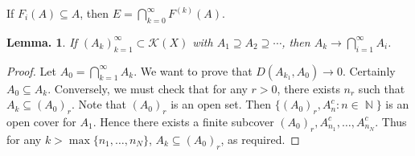 \documentclass[11pt, a4paper]{memoir}
\DeclareMathOperator{\N}{{\mathbb{N}}}
\theoremstyle{change}
\newtheorem{lemma}[theorem]{Lemma.}
\theoremstyle{plain}
\theoremstyle{nonumberplain}
\newtheorem{proof}{Proof}
\numberwithin{equation}{section}
\begin{document}
If $F_i(A)\subseteq A$, then $E=\bigcap_{k=0}^\infty F^{(k)}(A)$.
\begin{lemma}
    If $(A_k)_{k=1}^\infty\subset\mathcal{K}(X)$ with $A_1\supseteq A_2\supseteq\cdots$, then $A_k\to\bigcap_{i=1}^\infty A_i$.
\end{lemma}
\begin{proof}
    Let $A_0=\bigcap_{k=1}^\infty A_k$.
    We want to prove that $D(A_{k_1},A_0)\to 0$.
    Certainly $A_0\subseteq A_k$.
    Conversely, we must check that for any $r>0$, there exists $n_r$ such that $A_k\subseteq (A_0)_r$.
    Note that $(A_0)_r$ is an open set.
    Then $\{(A_0)_r,A_n^c:n\in\N\}$ is an open cover for $A_1$.
    Hence there exists a finite subcover $(A_0)_r,A_{n_1}^c,\ldots,A_{n_N}^c$.
    Thus for any $k>\max\{n_1,\ldots,n_N\}$, $A_k\subseteq (A_0)_r$, as required.
\end{proof}
\end{document}
